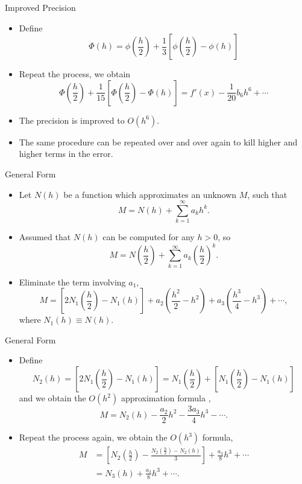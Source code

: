 \documentclass{beamer}
\begin{document}
\begin{frame}{Improved Precision}
\begin{itemize}
\item Define 
\[
\Phi(h)=\phi\left(\frac{h}{2}\right)+\frac{1}{3}\left[\phi\left(\frac{h}{2}\right)-\phi(h)\right]
\]
\item Repeat the process, we obtain
\[
\Phi\left(\frac{h}{2}\right)+\frac{1}{15}\left[\Phi\left(\frac{h}{2}\right)-\Phi(h)\right]=f'(x)-\frac{1}{20}b_6h^6+\cdots
\]
\item The precision is improved to $O(h^6)$.
\item The same procedure can be \alert{repeated over and over again} to kill higher and higher terms in the error. 
 \end{itemize}
\end{frame}
\begin{frame}{General Form}
\begin{itemize}
\item Let $N(h)$ be a function which approximates an unknown $M$, such that
\[
M=N(h)+\sum_{k=1}^{\infty} a_{k} h^{k}.
\]
\item Assumed that $N(h)$ can be computed for any $h>0$, so 
\[
M=N\left(\frac{h}{2}\right)+\sum_{k=1}^{\infty} a_{k} \left(\frac{h}{2}\right)^{k}.
\]
\item Eliminate the term involving $a_1$, 
\[
M=\left[2N_1\left(\frac{h}{2}\right)-N_1(h)\right]+a_2 \left(\frac{h^2}{2}-h^2\right)+a_3 \left(\frac{h^3}{4}-h^3\right)+\cdots,
\]
where $N_1(h)\equiv N(h)$.
\end{itemize}
\end{frame}
\begin{frame}{General Form }
\begin{itemize}
\item Define 
\[
N_2(h)=\left[2N_1\left(\frac{h}{2}\right)-N_1(h)\right]=N_1\left(\frac{h}{2}\right)+\left[N_1\left(\frac{h}{2}\right)-N_1(h)\right]
\]
and we obtain the $O(h^2)$ approximation formula ,
\[
M=N_2(h)-\frac{a_2}{2}h^2-\frac{3a_3}{4}h^3-\cdots.
\]
\item Repeat the process again, we obtain the $O(h^3)$ formula,
\begin{align*}
M &=\left[N_2\left(\frac{h}{2}\right)-\frac{N_2\left(\frac{h}{2}\right)-N_2(h)}{3}\right]+\frac{a_3}{8}h^3+\cdots\\
 &= N_3(h)+\frac{a_3}{8}h^3+\cdots.
\end{align*}
\end{itemize}
\end{frame}
\end{document}
